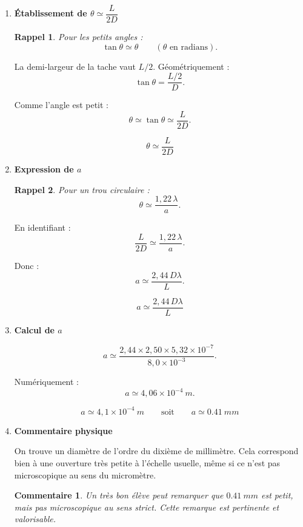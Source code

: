 \documentclass[11pt,a4paper]{article}
\newtheorem*{rappel}{Rappel}
\newtheorem*{commentaire}{Commentaire}
\begin{document}
\begin{enumerate}[label=\textbf{1.\arabic*}, resume, leftmargin=1.6em]

\item \textbf{Établissement de \(\theta \simeq \dfrac{L}{2D}\)}

\begin{rappel}
Pour les petits angles :
\[
\tan\theta \simeq \theta
\qquad (\theta \text{ en radians}).
\]
\end{rappel}

La demi-largeur de la tache vaut \(L/2\).  
Géométriquement :
\[
\tan\theta=\frac{L/2}{D}.
\]

Comme l’angle est petit :
\[
\theta \simeq \tan\theta \simeq \frac{L}{2D}.
\]

\[
\boxed{\theta \simeq \frac{L}{2D}}
\]

\item \textbf{Expression de \(a\)}

\begin{rappel}
Pour un trou circulaire :
\[
\theta \simeq \frac{1{,}22\,\lambda}{a}.
\]
\end{rappel}

En identifiant :
\[
\frac{L}{2D}\simeq \frac{1{,}22\,\lambda}{a}.
\]

Donc :
\[
a \simeq \frac{2{,}44\,D\lambda}{L}.
\]

\[
\boxed{a \simeq \frac{2{,}44\,D\lambda}{L}}
\]

\item \textbf{Calcul de \(a\)}

\[
a \simeq \frac{2{,}44\times 2{,}50\times 5{,}32\times 10^{-7}}{8{,}0\times 10^{-3}}.
\]

Numériquement :
\[
a \simeq 4{,}06\times 10^{-4}\ \si{m}.
\]

\[
\boxed{a \simeq 4{,}1\times 10^{-4}\ \si{m}}
\qquad\text{soit}\qquad
\boxed{a \simeq \SI{0,41}{mm}}
\]

\item \textbf{Commentaire physique}

On trouve un diamètre de l’ordre du dixième de millimètre.  
Cela correspond bien à une ouverture très petite à l’échelle usuelle, même si ce n’est pas microscopique au sens du micromètre.

\begin{commentaire}
Un très bon élève peut remarquer que \(\SI{0,41}{mm}\) est petit, mais pas \og microscopique \fg{} au sens strict. Cette remarque est pertinente et valorisable.
\end{commentaire}

\end{enumerate}
\end{document}
